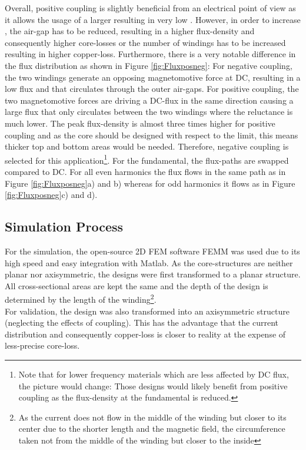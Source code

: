 \documentclass{IPEC2026}
\newcommand{\sbl}[1]{\glssymbol{#1}}
\begin{document}
Overall, positive coupling is slightly beneficial from an electrical point of view as it allows the usage of a larger \sbl{Lself} resulting in very low \sbl{DeltaIout}. However, in order to increase \sbl{Lself}, the air-gap has to be reduced, resulting in a higher flux-density and consequently higher core-losses or the number of windings has to be increased resulting in higher copper-loss.
Furthermore, there is a very notable difference in the flux distribution as shown in Figure \ref{fig:Fluxposneg}: For negative coupling, the two windings generate an opposing magnetomotive force at DC, resulting in a low flux and that circulates through the outer air-gaps. For positive coupling, the two magnetomotive forces are driving a DC-flux in the same direction causing a large flux that only circulates between the two windings where the reluctance is much lower. The peak flux-density is almost three times higher for positive coupling and as the core should be designed with respect to the \sbl{Hdc} limit, this means thicker top and bottom areas would be needed. Therefore, negative coupling is selected for this application\footnote{Note that for lower frequency materials which are less affected by DC flux, the picture would change: Those designs would likely benefit from positive coupling as the flux-density at the fundamental is reduced.}. For the fundamental, the flux-paths are swapped compared to DC. For all even harmonics the flux flows in the same path as in Figure \ref{fig:Fluxposneg}a) and b) whereas for odd harmonics it flows as in Figure \ref{fig:Fluxposneg}c) and d).

\subsection{Simulation Process}
For the simulation, the open-source 2D FEM software FEMM was used due to its high speed and easy integration with Matlab. As the core-structures are neither planar nor axisymmetric, the designs were first transformed to a planar structure. All cross-sectional areas are kept the same and the depth of the design is determined by the length of the winding\footnote{As the current does not flow in the middle of the winding but closer to its center due to the shorter length and the magnetic field, the circumference taken not from the middle of the winding but closer to the inside}. \\
For validation, the design was also transformed into an axisymmetric structure (neglecting the effects of coupling). This has the advantage that the current distribution and consequently copper-loss is closer to reality at the expense of less-precise core-loss.
\end{document}
